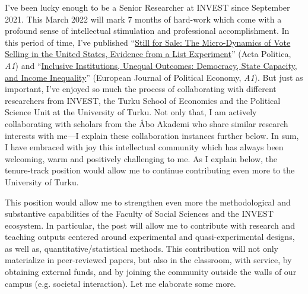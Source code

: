 \documentclass[10pt,stdletter,dateno,sigleft]{newlfm} %
\begin{document}
\begin{newlfm}
I've been lucky enough to be a Senior Researcher at INVEST since September 2021. This March 2022 will mark 7 months of hard-work which come with a profound sense of intellectual stimulation and professional accomplishment. In this period of time, I've published ``\href{https://link.springer.com/article/10.1057/s41269-020-00174-4}{Still for Sale: The Micro-Dynamics of Vote Selling in the United States, Evidence from a List Experiment}'' (Acta Politica, \emph{A1}) and ``\href{https://www.sciencedirect.com/science/article/pii/S0176268021000471?via%3Dihub}{Inclusive Institutions, Unequal Outcomes: Democracy, State Capacity, and Income Inequality}'' (European Journal of Political Economy, \emph{A1}). But just as important, I've enjoyed so much the process of collaborating with different researchers from INVEST, the Turku School of Economics and the Political Science Unit at the University of Turku. Not only that, I am actively collaborating with scholars from the \AA bo Akademi who share similar research interests with me---I explain these collaboration instances further below. In sum, I have embraced with joy this intellectual community which has always been welcoming, warm and positively challenging to me. As I explain below, the tenure-track position would allow me to continue contributing even more to the University of Turku.

This position would allow me to strengthen even more the methodological and substantive capabilities of the Faculty of Social Sciences and the INVEST ecosystem. In particular, the post will allow me to contribute with research and teaching outputs centered around experimental and quasi-experimental designs, as well as, quantitative/statistical methods. This contribution will not only materialize in peer-reviewed papers, but also in the classroom, with service, by obtaining external funds, and by joining the community outside the walls of our campus (e.g. societal interaction). Let me elaborate some more. 


\end{newlfm}
\end{document}

